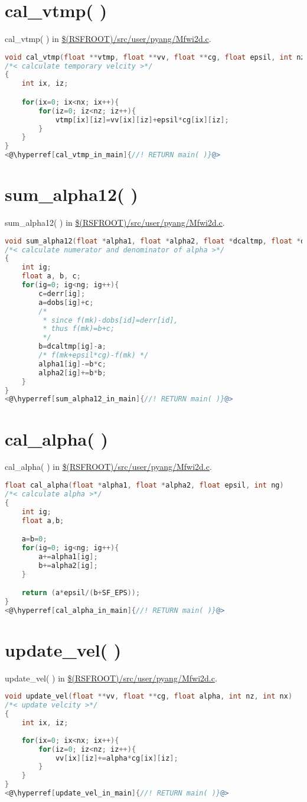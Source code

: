 \documentclass[a4paper,11pt]{article}
\theoremstyle{mytheor}
\begin{document}
\section*{cal\_vtmp( )}
cal\_vtmp( ) in \url{$(RSFROOT)/src/user/pyang/Mfwi2d.c}.
\begin{lstlisting}[label={cal_vtmp},language=C,tabsize=4,caption=cal\_vtmp( )]
void cal_vtmp(float **vtmp, float **vv, float **cg, float epsil, int nz, int nx)
/*< calculate temporary velcity >*/
{
	int ix, iz;

	for(ix=0; ix<nx; ix++){
		for(iz=0; iz<nz; iz++){
			vtmp[ix][iz]=vv[ix][iz]+epsil*cg[ix][iz];
		}
	}
}
<@\hyperref[cal_vtmp_in_main]{//! RETURN main( )}@>
\end{lstlisting}

\section*{sum\_alpha12( )}
sum\_alpha12( ) in \url{$(RSFROOT)/src/user/pyang/Mfwi2d.c}.
\begin{lstlisting}[label={sum_alpha12},language=C,tabsize=4,caption=sum\_alpha12( )]
void sum_alpha12(float *alpha1, float *alpha2, float *dcaltmp, float *dobs, float *derr, int ng)
/*< calculate numerator and denominator of alpha >*/
{
	int ig;
	float a, b, c;
	for(ig=0; ig<ng; ig++){
		c=derr[ig];
		a=dobs[ig]+c;	
		/* 
		 * since f(mk)-dobs[id]=derr[id], 
		 * thus f(mk)=b+c; 
		 */
		b=dcaltmp[ig]-a;
		/* f(mk+epsil*cg)-f(mk) */
		alpha1[ig]-=b*c; 
		alpha2[ig]+=b*b; 
	}
}
<@\hyperref[sum_alpha12_in_main]{//! RETURN main( )}@>
\end{lstlisting}

\section*{cal\_alpha( )}
cal\_alpha( ) in \url{$(RSFROOT)/src/user/pyang/Mfwi2d.c}.
\begin{lstlisting}[label={cal_alpha},language=C,tabsize=4,caption=cal\_alpha( )]
float cal_alpha(float *alpha1, float *alpha2, float epsil, int ng)
/*< calculate alpha >*/
{
	int ig;
	float a,b;

	a=b=0;
	for(ig=0; ig<ng; ig++){
		a+=alpha1[ig];
		b+=alpha2[ig];
	}

	return (a*epsil/(b+SF_EPS));
}
<@\hyperref[cal_alpha_in_main]{//! RETURN main( )}@>
\end{lstlisting}

\section*{update\_vel( )}
update\_vel( ) in \url{$(RSFROOT)/src/user/pyang/Mfwi2d.c}.
\begin{lstlisting}[label={update_vel},language=C,tabsize=4,caption=update\_vel( )]
void update_vel(float **vv, float **cg, float alpha, int nz, int nx)
/*< update velcity >*/
{
	int ix, iz;
	
	for(ix=0; ix<nx; ix++){
		for(iz=0; iz<nz; iz++){
			vv[ix][iz]+=alpha*cg[ix][iz];
		}
	}
}
<@\hyperref[update_vel_in_main]{//! RETURN main( )}@>
\end{lstlisting}
\end{document}
